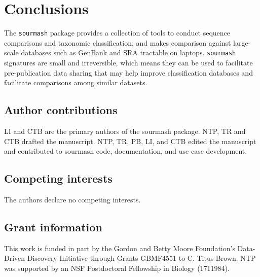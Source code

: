 \documentclass[10pt,a4paper,twocolumn]{article}
\begin{document}
\section*{Conclusions}

The \lstinline{sourmash} package provides a collection of tools to conduct sequence comparisons and taxonomic classification, and makes comparison against large-scale databases such as GenBank and SRA tractable on laptops. \lstinline{sourmash} signatures are small and irreversible, which means they can be used to facilitate pre-publication data sharing that may help improve classification databases and facilitate comparisons among similar datasets. 


\subsection*{Author contributions}
LI and CTB are the primary authors of the sourmash package. NTP, TR and CTB drafted the manuscript. NTP, TR, PB, LI, and CTB edited the manuscript and contributed to sourmash code, documentation, and use case development. 

\subsection*{Competing interests}
The authors declare no competing interests.

\subsection*{Grant information}
This work is funded in part by the Gordon and Betty Moore Foundation’s Data-Driven Discovery Initiative through Grants GBMF4551 to C. Titus Brown. NTP was supported by an NSF Postdoctoral Fellowship in Biology (1711984).


{\small
}




\end{document}
